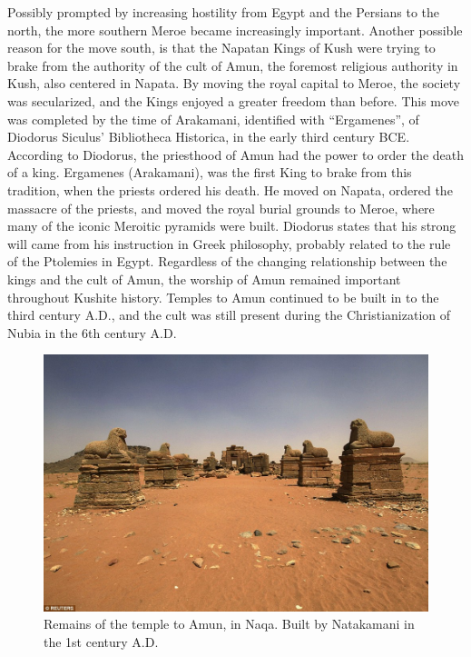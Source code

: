 \documentclass[a4paper,12pt]{scrreprt}
\begin{document}
Possibly prompted by increasing hostility from Egypt and the Persians to the north, the more southern Meroe became increasingly important. Another possible reason for the move south, is that the Napatan Kings of Kush were trying to brake from the authority of the cult of Amun, the foremost religious authority in Kush, also centered in Napata. By moving the royal capital to Meroe, the society was secularized, and the Kings enjoyed a greater freedom than before. This move was completed by the time of Arakamani, identified with “Ergamenes”, of Diodorus Siculus’ Bibliotheca Historica, in the early third century BCE. According to Diodorus, the priesthood of Amun had the power to order the death of a king. Ergamenes (Arakamani), was the first King to brake from this tradition, when the priests ordered his death. He moved on Napata, ordered the massacre of the priests, and moved the royal burial grounds to Meroe, where many of the iconic Meroitic pyramids were built. Diodorus states that his strong will came from his instruction in Greek philosophy, probably related to the rule of the Ptolemies in Egypt. Regardless of the changing relationship between the kings and the cult of Amun, the worship of Amun remained important throughout Kushite history. Temples to Amun continued to be built in to the third century A.D., and the cult was still present during the Christianization of Nubia in the 6th century A.D. 

\begin{figure}[H]
	\centering
	\includegraphics[width=\textwidth]{img/temple_of_amun}
	\caption{Remains of the temple to Amun, in Naqa. Built by Natakamani in the 1st century A.D.}
\end{figure}
\end{document}
